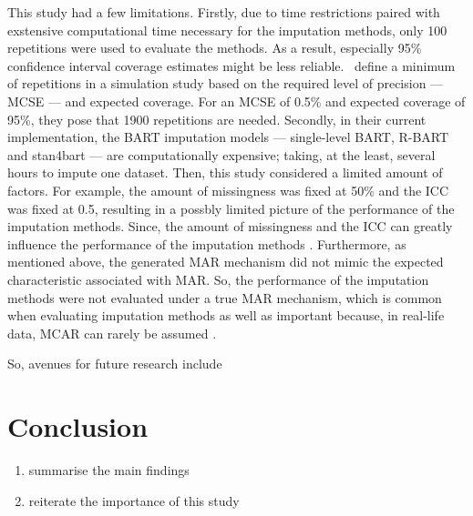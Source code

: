 \documentclass[10pt, a4paper, titlepage]{article}
\begin{document}
This study had a few limitations. Firstly, due to time restrictions paired with exstensive computational time necessary for the imputation methods, only 100 repetitions were used to evaluate the methods. As a result, especially 95\% confidence interval coverage estimates might be less reliable.~\citet{morris2019} define a minimum of repetitions in a simulation study based on the required level of precision --- MCSE --- and expected coverage. For an  MCSE of 0.5\% and expected coverage of 95\%, they pose that 1900 repetitions are needed. Secondly, in their current implementation, the BART imputation models --- single-level BART, R-BART and stan4bart --- are computationally expensive; taking, at the least, several hours to impute one dataset. Then, this study considered a limited amount of factors. For example, the amount of missingness was fixed at 50\% and the ICC was fixed at 0.5, resulting in a possbly limited picture of the performance of the imputation methods. Since, the amount of missingness and the ICC can greatly influence the performance of the imputation methods \citep{enders2018,enders2018a,enders2020,mistler2017,akkayahocagil2023,grund2016,grund2018a,grund2018,ludtke2017,grund2021}. Furthermore, as mentioned above, the generated MAR mechanism did not mimic the expected characteristic associated with MAR. So, the performance of the imputation methods were not evaluated under a true MAR mechanism, which is common when evaluating imputation methods \citep{buurenFlexibleImputationMissing2018,enders2018a,peeters2015,austin2021,carpenter2013,little2002,grund2018,ludtke2017,grund2021,schouten2021} as well as important because, in real-life data, MCAR can rarely be assumed \citep{oberman2023,buurenFlexibleImputationMissing2018,kang2013,little2002}.

So, avenues for future research include 

\section{Conclusion}

\begin{enumerate}
    \item summarise the main findings
    \item reiterate the importance of this study
\end{enumerate}

\newpage
\end{document}

